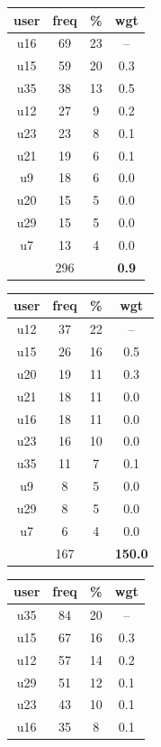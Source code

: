 \begin{table}
\centering
\begin{tabular}{ |c|c|c|c| }
	\hline
	\textbf{user} & \textbf{freq} & \textbf{\%} & \textbf{wgt} \\
	\hline
	u16 & 69 & 23 & -- \\
	u15 & 59 & 20 & 0.3 \\
	u35 & 38 & 13 & 0.5 \\
	u12 & 27 & 9 & 0.2 \\
	u23 & 23 & 8 & 0.1 \\
	u21 & 19 & 6 & 0.1 \\
	u9 & 18 & 6 & 0.0 \\
	u20 & 15 & 5 & 0.0 \\
	u29 & 15 & 5 & 0.0 \\
	u7 & 13 & 4 & 0.0 \\
	 & 296 & & \textbf{0.9} \\
	\hline
\end{tabular}
\begin{tabular}{ |c|c|c|c| }
	\hline
	\textbf{user} & \textbf{freq} & \textbf{\%} & \textbf{wgt} \\
	\hline
	u12 & 37 & 22 & -- \\
	u15 & 26 & 16 & 0.5 \\
	u20 & 19 & 11 & 0.3 \\
	u21 & 18 & 11 & 0.0 \\
	u16 & 18 & 11 & 0.0 \\
	u23 & 16 & 10 & 0.0 \\
	u35 & 11 & 7 & 0.1 \\
	u9 & 8 & 5 & 0.0 \\
	u29 & 8 & 5 & 0.0 \\
	u7 & 6 & 4 & 0.0 \\
	 & 167 & & \textbf{150.0} \\
	\hline
\end{tabular}
\begin{tabular}{ |c|c|c|c| }
	\hline
	\textbf{user} & \textbf{freq} & \textbf{\%} & \textbf{wgt} \\
	\hline
	u35 & 84 & 20 & -- \\
	u15 & 67 & 16 & 0.3 \\
	u12 & 57 & 14 & 0.2 \\
	u29 & 51 & 12 & 0.1 \\
	u23 & 43 & 10 & 0.1 \\
	u16 & 35 & 8 & 0.1 \\

\end{tabular}
\end{table}

